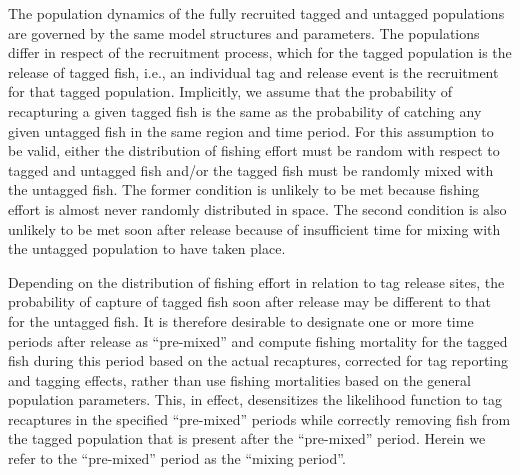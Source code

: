 The population dynamics of the fully recruited tagged and untagged populations are governed by the same model structures and parameters. The populations differ in respect of the recruitment process, which for the tagged population is the release of tagged fish, i.e., an individual tag and release event is the recruitment for that tagged population. Implicitly, we assume that the probability of recapturing a given tagged fish is the same as the probability of catching any given untagged fish in the same region and time period. For this assumption to be valid, either the distribution of fishing effort must be random with respect to tagged and untagged fish and/or the tagged fish must be randomly mixed with the untagged fish. The former condition is unlikely to be met because fishing effort is almost never randomly distributed in space. The second condition is also unlikely to be met soon after release because of insufficient time for mixing with the untagged population to have taken place.

Depending on the distribution of fishing effort in relation to tag release sites, the probability of capture of tagged fish soon after release may be different to that for the untagged fish. It is therefore desirable to designate one or more time periods after release as ``pre-mixed'' and compute fishing mortality for the tagged fish during this period based on the actual recaptures, corrected for tag reporting and tagging effects, rather than use fishing mortalities based on the general population parameters. This, in effect, desensitizes the likelihood function to tag recaptures in the specified ``pre-mixed'' periods while correctly removing fish from the tagged population that is present after the ``pre-mixed'' period. Herein we refer to the ``pre-mixed'' period as the ``mixing period''.

